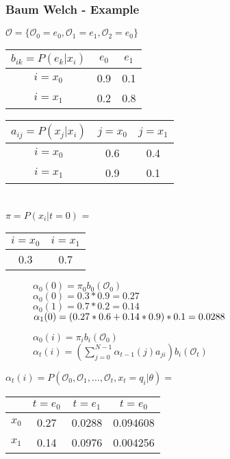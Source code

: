 \begin{frame}
	\frametitle{Baum Welch - Example}
  \begin{table}
  \centering
  $\mathcal{O} = \{\mathcal{O}_0 = e_0, \mathcal{O}_1 = e_1, \mathcal{O}_2 = e_0\}$\\
  \begin{tabular}{| c | c | c |}
  	\hline
    $b_{ik} = P(e_k|x_i)$ & $e_0$ & $e_1$ \\ \hline
    $i = x_0$                 & 0.9   & 0.1   \\ \hline
    $i = x_1$                 & 0.2   & 0.8   \\ \hline
  \end{tabular}
  \begin{tabular}{| c | c | c |}
  	\hline
    $a_{ij} = P(x_j|x_i)$ & $j = x_0$ & $j = x_1$ \\ \hline
    $i = x_0$                 & 0.6   & 0.4   \\ \hline
    $i = x_1$                 & 0.9   & 0.1   \\ \hline
  \end{tabular}
  \\$\pi = P(x_i|t=0)$ =
  \begin{tabular}{| c | c |}
  	\hline
    $i = x_0$ & $i = x_1$ \\ \hline
    0.3   & 0.7   \\ \hline
  \end{tabular}
  \begin{subfigure}{4.3cm}
  \begin{framed}
  $\alpha_0(0)=\pi_0 b_0(\mathcal{O}_0)$\\
  $\alpha_0(0)=0.3*0.9=0.27$\\
  $\alpha_0(1)=0.7*0.2=0.14$\\
  $\alpha_1(0)=\\(0.27*0.6+0.14*0.9)*0.1=0.0288$
  \end{framed}
  \end{subfigure}
  \begin{subfigure}{5.4cm}
  \centering
  \begin{framed}
  $\alpha_0(i) = \pi_i b_i(\mathcal{O}_0)$\\
  $\alpha_t(i) = \left(\sum\limits_{j=0}^{N-1} \alpha_{t-1}(j)a_{ji}\right)b_i(\mathcal{O}_t)$
  \end{framed}  
  \end{subfigure}
  $\alpha_t(i) = P(\mathcal{O}_0, \mathcal{O}_1, \dots ,\mathcal{O}_t , x_t = q_i | \theta) =$
  \begin{tabular}{| c | c | c | c |}
  	\hline
          & $t=e_0$ & $t=e_1$ & $t=e_0$ \\ \hline
    $x_0$ & 0.27    & 0.0288  & 0.094608 \\ \hline
    $x_1$ & 0.14    & 0.0976  & 0.004256 \\ \hline
  \end{tabular}
\end{table}
\end{frame}

